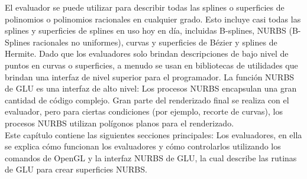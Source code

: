 El evaluador se puede utilizar para describir todas las splines o superficies de polinomios o polinomios racionales en cualquier grado. Esto incluye casi todas las splines y superficies de splines en uso hoy en día, incluidas B-splines, NURBS (B-Splines racionales no uniformes), curvas y superficies de Bézier y splines de Hermite. Dado que los evaluadores solo brindan descripciones de bajo nivel de puntos en curvas o superficies, a menudo se usan en bibliotecas de utilidades que brindan una interfaz de nivel superior para el programador. La función NURBS de GLU es una interfaz de alto nivel: Los procesos NURBS encapsulan una gran cantidad de código complejo. Gran parte del renderizado final se realiza con el evaluador, pero para ciertas condiciones (por ejemplo, recorte de curvas), los procesos NURBS utilizan polígonos planos para el renderizado.\\

Este capítulo contiene las siguientes secciones principales: Los evaluadores, en ella se explica cómo funcionan los evaluadores y cómo controlarlos utilizando los comandos de OpenGL y la interfaz NURBS de GLU, la cual describe las rutinas de GLU para crear superficies NURBS.
